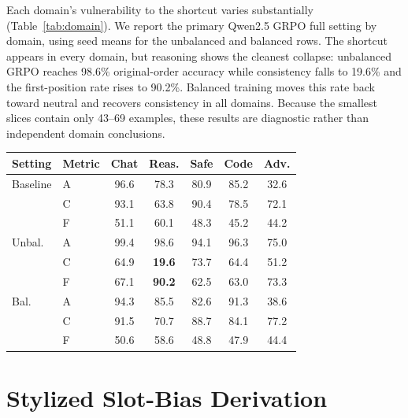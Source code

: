 \documentclass[letterpaper]{article}
\newcommand{\multirow}[3]{#3}
\begin{document}
Each domain's vulnerability to the shortcut varies substantially (Table~\ref{tab:domain}). We report the primary Qwen2.5 GRPO full setting by domain, using seed means for the unbalanced and balanced rows. The shortcut appears in every domain, but reasoning shows the cleanest collapse: unbalanced GRPO reaches 98.6\% original-order accuracy while consistency falls to 19.6\% and the first-position rate rises to 90.2\%. Balanced training moves this rate back toward neutral and recovers consistency in all domains. Because the smallest slices contain only 43--69 examples, these results are diagnostic rather than independent domain conclusions.

\begin{center}
\begin{minipage}{\columnwidth}
\centering
\footnotesize
\setlength{\tabcolsep}{3pt}
\begin{tabular}{llccccc}
\toprule
\textbf{Setting} & \textbf{Metric} & \textbf{Chat} & \textbf{Reas.} & \textbf{Safe} & \textbf{Code} & \textbf{Adv.} \\
\midrule
\multirow{3}{*}{Baseline} & A & 96.6 & 78.3 & 80.9 & 85.2 & 32.6 \\
 & C & 93.1 & 63.8 & 90.4 & 78.5 & 72.1 \\
 & F & 51.1 & 60.1 & 48.3 & 45.2 & 44.2 \\
\midrule
\multirow{3}{*}{Unbal.} & A & 99.4 & 98.6 & 94.1 & 96.3 & 75.0 \\
 & C & 64.9 & \textbf{19.6} & 73.7 & 64.4 & 51.2 \\
 & F & 67.1 & \textbf{90.2} & 62.5 & 63.0 & 73.3 \\
\midrule
\multirow{3}{*}{Bal.} & A & 94.3 & 85.5 & 82.6 & 91.3 & 38.6 \\
 & C & 91.5 & 70.7 & 88.7 & 84.1 & 77.2 \\
 & F & 50.6 & 58.6 & 48.8 & 47.9 & 44.4 \\
\bottomrule
\end{tabular}
\captionsetup{hypcap=false}
\label{tab:domain}
\end{minipage}
\end{center}

\section{Stylized Slot-Bias Derivation}
\label{app:slotbias}
\end{document}
